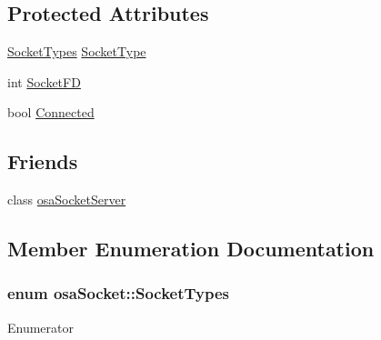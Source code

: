 \subsection*{Protected Attributes}
\begin{DoxyCompactItemize}
\item 
\hyperlink{classosa_socket_adeb99e6a5b2d4e503e0308ccb9677a00}{Socket\-Types} \hyperlink{classosa_socket_ac893ce4c18feac9b627df95993156482}{Socket\-Type}
\item 
int \hyperlink{classosa_socket_aa2b18a862994f6498868186a44d28793}{Socket\-F\-D}
\item 
bool \hyperlink{classosa_socket_ab44f88953d932cd97a9c772155d21e37}{Connected}
\end{DoxyCompactItemize}
\subsection*{Friends}
\begin{DoxyCompactItemize}
\item 
class \hyperlink{classosa_socket_abe48006d88cc6ef49f926f1eab169439}{osa\-Socket\-Server}
\end{DoxyCompactItemize}


\subsection{Member Enumeration Documentation}
\hypertarget{classosa_socket_adeb99e6a5b2d4e503e0308ccb9677a00}{
\subsubsection[{Socket\-Types}]{\setlength{\rightskip}{0pt plus 5cm}enum {\bf osa\-Socket\-::\-Socket\-Types}}}\label{classosa_socket_adeb99e6a5b2d4e503e0308ccb9677a00}
\begin{Desc}
\item[Enumerator]\par
\begin{description}
\item[{\em 
\hypertarget{classosa_socket_adeb99e6a5b2d4e503e0308ccb9677a00a30ff2c2d5d46158f56ac6d521629612a}{U\-D\-P}\label{classosa_socket_adeb99e6a5b2d4e503e0308ccb9677a00a30ff2c2d5d46158f56ac6d521629612a}
}]\item[{\em 
\hypertarget{classosa_socket_adeb99e6a5b2d4e503e0308ccb9677a00a285ce3d0ac4094f708fa3f7b2f222430}{T\-C\-P}\label{classosa_socket_adeb99e6a5b2d4e503e0308ccb9677a00a285ce3d0ac4094f708fa3f7b2f222430}
}]\end{description}
\end{Desc}


